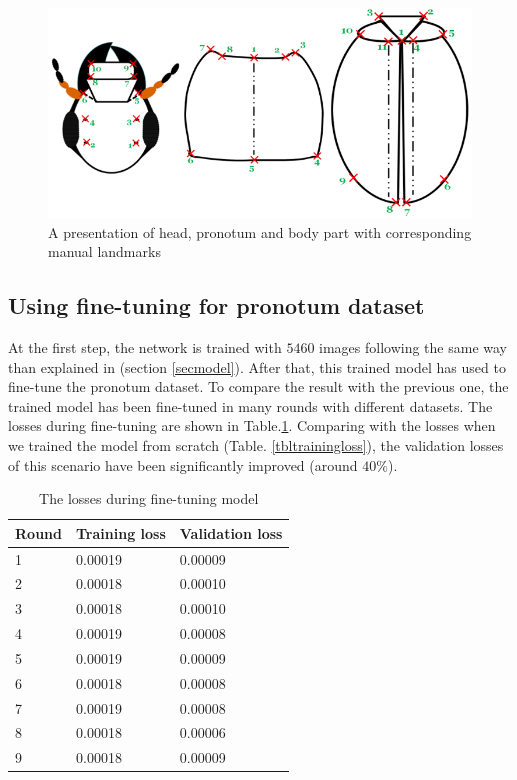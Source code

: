 \documentclass[10pt]{article}
\begin{document}
\begin{figure}[htbp]
        \centering
        \includegraphics[scale=0.3]{images/merge}
    \caption{\small{A presentation of head, pronotum and body part with corresponding manual landmarks}} 
    \label{figshape3parts}
\end{figure}

\subsection{Using fine-tuning for pronotum dataset}
At the first step, the network is trained with $5460$ images following
the same way than explained in (section \ref{secmodel}). After that, 
this trained model has used to fine-tune the pronotum dataset. To compare the result with
the previous one, the trained model has been fine-tuned in many rounds
with different datasets. The losses during fine-tuning are shown in
Table.\ref{tblfinetuningloss}. Comparing with the losses when we
trained the model from scratch (Table. \ref{tbltrainingloss}), the
validation losses of this scenario have been significantly improved (around
$40\%$).
\begin{table}[h!]
	\centering
	\begin{tabular}{l l l}
	Round & Training loss & Validation loss \\ \hline
	1 & 0.00019 & 0.00009  \\ \hline
	2 & 0.00018 & 0.00010 \\ \hline
	3 & 0.00018 & 0.00010 \\ \hline
	4 & 0.00019 & 0.00008 \\ \hline
	5 & 0.00019 & 0.00009 \\ \hline
	6 & 0.00018 & 0.00008 \\ \hline
	7 & 0.00019 & 0.00008 \\ \hline
	8 & 0.00018 & 0.00006 \\ \hline
	9 & 0.00018 & 0.00009 \\ \hline
	\end{tabular}
	\caption{\small{The losses during fine-tuning model}}
	\label{tblfinetuningloss}
\end{table}
\end{document}
